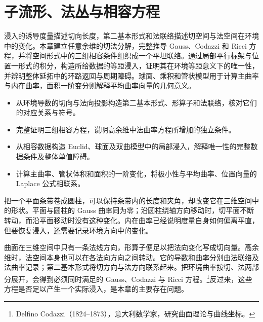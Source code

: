 
% 
% 

\chapter{子流形、法丛与相容方程}
\label{g3:ch:04}

\begin{chapterabstract}
	浸入的诱导度量描述切向长度，第二基本形式和法联络描述切空间与法空间在环境中的变化。本章建立任意余维的切法分解，完整推导 Gauss、Codazzi 和 Ricci 方程，并将空间形式中的三组相容条件组织成一个平坦联络。通过局部平行标架与位置一形式的积分，构造所给数据的等距浸入，证明其在环境等距意义下的唯一性，并辨明整体延拓中的环路返回与周期障碍。球面、乘积和管状模型用于计算主曲率与内在曲率，面积一阶变分则解释平均曲率向量的几何意义。
\end{chapterabstract}

\begin{learninggoals}
	\begin{itemize}
		\item 从环境导数的切向与法向投影构造第二基本形式、形算子和法联络，核对它们的对应关系与符号。
		\item 完整证明三组相容方程，说明高余维中法曲率方程所增加的独立条件。
		\item 从相容数据构造 Euclid、球面及双曲模型中的局部浸入，解释唯一性的完整数据条件及整体单值障碍。
		\item 计算主曲率、管状体积和面积的一阶变化，将极小性与平均曲率、位置向量的 Laplace 公式相联系。
	\end{itemize}
\end{learninggoals}

把一个平面条带卷成圆柱，可以保持条带内的长度和夹角，却改变它在三维空间中的形状。平面与圆柱的 Gauss 曲率同为零；沿圆柱绕轴方向移动时，切平面不断转动，而沿平面移动时没有这种变化。内在曲率已经说明度量自身如何偏离平直，但要恢复浸入，还需要记录环境方向中的变化。

\ProseParagraphBreak

曲面在三维空间中只有一条法线方向，形算子便足以把法向变化写成切向量。高余维时，法空间本身也可以在各法向方向之间转动。它的导数和曲率分别由法联络及法曲率记录；第二基本形式将切方向与法方向联系起来。把环境曲率按切、法两部分展开，会得到必须同时满足的 Gauss、Codazzi 与 Ricci 方程。\footnote{Delfino Codazzi（1824--1873），意大利数学家，研究曲面理论与曲线坐标。}反过来，这些方程是否足以产生一个实际浸入，是本章的主要存在问题。

